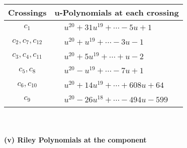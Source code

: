 \documentclass[1p]{elsarticle_modified}
\theoremstyle{definition}
\begin{document}
\begin{tabular}{m{50pt}|m{274pt}}
Crossings & \hspace{64pt}u-Polynomials at each crossing \\
\hline $$\begin{aligned}c_{1}\end{aligned}$$&$\begin{aligned}
&u^{20}+31 u^{19}+\cdots-5 u+1
\end{aligned}$\\
\hline $$\begin{aligned}c_{2},c_{7},c_{12}\end{aligned}$$&$\begin{aligned}
&u^{20}+u^{19}+\cdots-3 u-1
\end{aligned}$\\
\hline $$\begin{aligned}c_{3},c_{4},c_{11}\end{aligned}$$&$\begin{aligned}
&u^{20}+5 u^{19}+\cdots+u-2
\end{aligned}$\\
\hline $$\begin{aligned}c_{5},c_{8}\end{aligned}$$&$\begin{aligned}
&u^{20}- u^{19}+\cdots-7 u+1
\end{aligned}$\\
\hline $$\begin{aligned}c_{6},c_{10}\end{aligned}$$&$\begin{aligned}
&u^{20}+14 u^{19}+\cdots+608 u+64
\end{aligned}$\\
\hline $$\begin{aligned}c_{9}\end{aligned}$$&$\begin{aligned}
&u^{20}-26 u^{18}+\cdots-494 u-599
\end{aligned}$\\
\hline
\end{tabular}\\~\\
\newpage\renewcommand{\arraystretch}{1}
\flushleft \textbf{(v) Riley Polynomials at the component}\newline \\
\end{document}
